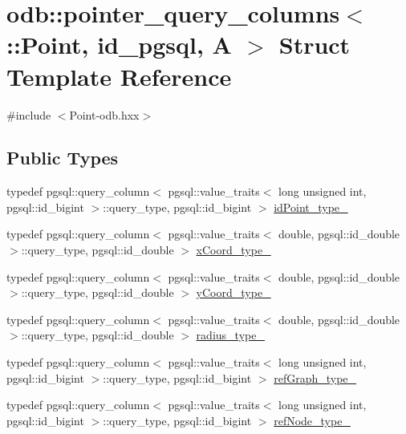 \hypertarget{structodb_1_1pointer__query__columns_3_01_1_1_point_00_01id__pgsql_00_01_a_01_4}{}\section{odb\+:\+:pointer\+\_\+query\+\_\+columns$<$ \+:\+:Point, id\+\_\+pgsql, A $>$ Struct Template Reference}
\label{structodb_1_1pointer__query__columns_3_01_1_1_point_00_01id__pgsql_00_01_a_01_4}


{\ttfamily \#include $<$Point-\/odb.\+hxx$>$}

\subsection*{Public Types}
\begin{DoxyCompactItemize}
\item 
typedef pgsql\+::query\+\_\+column$<$ pgsql\+::value\+\_\+traits$<$ long unsigned int, pgsql\+::id\+\_\+bigint $>$\+::query\+\_\+type, pgsql\+::id\+\_\+bigint $>$ \hyperlink{structodb_1_1pointer__query__columns_3_01_1_1_point_00_01id__pgsql_00_01_a_01_4_ab040a049d0d3ee3f9aa48ed84b384cba}{id\+Point\+\_\+type\+\_\+}
\item 
typedef pgsql\+::query\+\_\+column$<$ pgsql\+::value\+\_\+traits$<$ double, pgsql\+::id\+\_\+double $>$\+::query\+\_\+type, pgsql\+::id\+\_\+double $>$ \hyperlink{structodb_1_1pointer__query__columns_3_01_1_1_point_00_01id__pgsql_00_01_a_01_4_a5e9f6d30d27a826d7ad60ce86c6fc70d}{x\+Coord\+\_\+type\+\_\+}
\item 
typedef pgsql\+::query\+\_\+column$<$ pgsql\+::value\+\_\+traits$<$ double, pgsql\+::id\+\_\+double $>$\+::query\+\_\+type, pgsql\+::id\+\_\+double $>$ \hyperlink{structodb_1_1pointer__query__columns_3_01_1_1_point_00_01id__pgsql_00_01_a_01_4_ade880c49b2a6928423bad8f7207e6fed}{y\+Coord\+\_\+type\+\_\+}
\item 
typedef pgsql\+::query\+\_\+column$<$ pgsql\+::value\+\_\+traits$<$ double, pgsql\+::id\+\_\+double $>$\+::query\+\_\+type, pgsql\+::id\+\_\+double $>$ \hyperlink{structodb_1_1pointer__query__columns_3_01_1_1_point_00_01id__pgsql_00_01_a_01_4_aa0748d827e6d7d2cfa8c1279510f6cb4}{radius\+\_\+type\+\_\+}
\item 
typedef pgsql\+::query\+\_\+column$<$ pgsql\+::value\+\_\+traits$<$ long unsigned int, pgsql\+::id\+\_\+bigint $>$\+::query\+\_\+type, pgsql\+::id\+\_\+bigint $>$ \hyperlink{structodb_1_1pointer__query__columns_3_01_1_1_point_00_01id__pgsql_00_01_a_01_4_a613de48a47de6c39f97cd5541b8df5f6}{ref\+Graph\+\_\+type\+\_\+}
\item 
typedef pgsql\+::query\+\_\+column$<$ pgsql\+::value\+\_\+traits$<$ long unsigned int, pgsql\+::id\+\_\+bigint $>$\+::query\+\_\+type, pgsql\+::id\+\_\+bigint $>$ \hyperlink{structodb_1_1pointer__query__columns_3_01_1_1_point_00_01id__pgsql_00_01_a_01_4_ad19ee7a02f58090dd097ab1b5540bf45}{ref\+Node\+\_\+type\+\_\+}
\end{DoxyCompactItemize}
